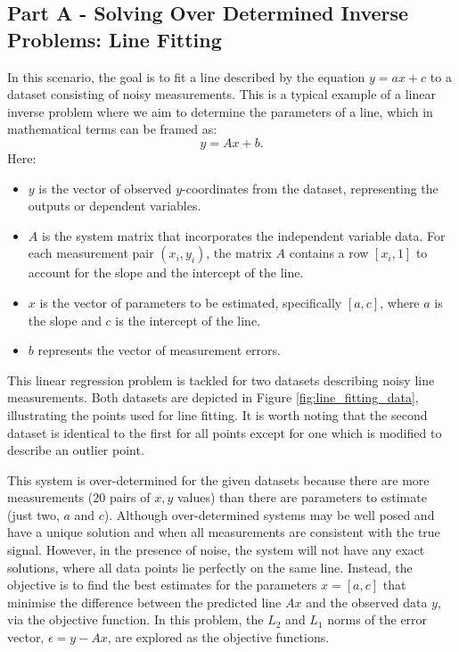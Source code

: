 \documentclass[11pt]{article}
\begin{document}
\subsection{Part A - Solving Over Determined Inverse Problems: Line Fitting}
In this scenario, the goal is to fit a line described by the equation \( y = ax + c \) to a dataset consisting of noisy measurements. This is a typical example of a linear inverse problem where we aim to determine the parameters of a line, which in mathematical terms can be framed as:
\[
y = Ax + b.
\]
Here:
\begin{itemize}
    \item \(y\) is the vector of observed \(y\)-coordinates from the dataset, representing the outputs or dependent variables.
    \item \(A\) is the system matrix that incorporates the independent variable data. For each measurement pair \((x_i, y_i)\), the matrix \(A\) contains a row \([x_i, 1]\) to account for the slope and the intercept of the line.
    \item \(x\) is the vector of parameters to be estimated, specifically \([a, c]\), where \(a\) is the slope and \(c\) is the intercept of the line.
    \item \(b\) represents the vector of measurement errors.
\end{itemize}
This linear regression problem is tackled for two datasets describing noisy line measurements. Both datasets are depicted in Figure \ref{fig:line_fitting_data}, illustrating the points used for line fitting. It is worth noting that the second dataset is identical to the first for all points except for one which is modified to describe an outlier point. 

This system is over-determined for the given datasets because there are more measurements (\(20\) pairs of \(x, y\) values) than there are parameters to estimate (just two, \(a\) and \(c\)). Although over-determined systems may be well posed and have a unique solution and when all measurements are consistent with the true signal. However, in the presence of noise, the system will not have any exact solutions, where all data points lie perfectly on the same line. Instead, the objective is to find the best estimates for the parameters \(x = [a, c]\) that minimise the difference between the predicted line \( Ax \) and the observed data \( y \), via the objective function. In this problem, the \(L_2\) and \(L_1\) norms of the error vector, $\epsilon = y - Ax$, are explored as the objective functions. 
\end{document}
